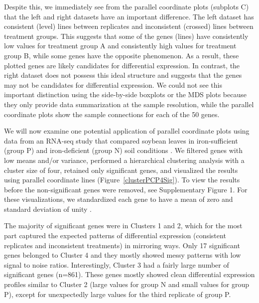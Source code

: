 \documentclass{bioinfo}
\begin{document}
Despite this, we immediately see from the parallel coordinate plots (subplots C) that the left and right datasets have an important difference. The left dataset has consistent (level) lines between replicates and inconsistent (crossed) lines between treatment groups. This suggests that some of the genes (lines) have consistently low values for treatment group A and consistently high values for treatment group B, while some genes have the opposite phenomenon. As a result, these plotted genes are likely candidates for differential expression. In contrast, the right dataset does not possess this ideal structure and suggests that the genes may not be candidates for differential expression. We could not see this important distinction using the side-by-side boxplots or the MDS plots because they only provide data summarization at the sample resolution, while the parallel coordinate plots show the sample connections for each of the 50 genes.

We will now examine one potential application of parallel coordinate plots using data from an RNA-seq study that compared soybean leaves in iron-sufficient (group P) and iron-deficient (group N) soil conditions \citep{Lauter}. We filtered genes with low means and/or variance, performed a hierarchical clustering analysis with a cluster size of four, retained only significant genes, and visualized the results using parallel coordinate lines (Figure~\ref{clusterPCP4Sig}). To view the results before the non-significant genes were removed, see Supplementary Figure 1. For these visualizations, we standardized each gene to have a mean of zero and standard deviation of unity \citep{Chandrasekhar, de Souto}.

The majority of significant genes were in Clusters 1 and 2, which for the most part captured the expected patterns of differential expression (consistent replicates and inconsistent treatments) in mirroring ways. Only 17 significant genes belonged to Cluster 4 and they mostly showed messy patterns with low signal to noise ratios. Interestingly, Cluster 3 had a fairly large number of significant genes (n=861). These genes mostly showed clean differential expression profiles similar to Cluster 2 (large values for group N and small values for group P), except for unexpectedly large values for the third replicate of group P. 
\end{document}
